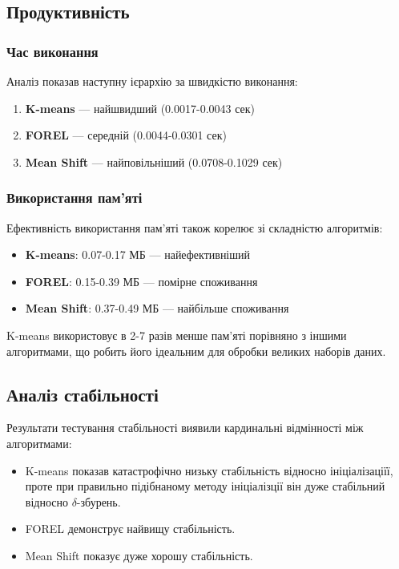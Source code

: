 \documentclass[12pt,a4paper]{article}
\begin{document}
\subsection{Продуктивність}

\subsubsection{Час виконання}
Аналіз показав наступну ієрархію за швидкістю виконання:

\begin{enumerate}
    \item \textbf{K-means} — найшвидший (0.0017-0.0043 сек)
    \item \textbf{FOREL} — середній (0.0044-0.0301 сек)
    \item \textbf{Mean Shift} — найповільніший (0.0708-0.1029 сек)
\end{enumerate}

\subsubsection{Використання пам'яті}
Ефективність використання пам'яті також корелює зі складністю алгоритмів:

\begin{itemize}
    \item \textbf{K-means}: 0.07-0.17 МБ — найефективніший
    \item \textbf{FOREL}: 0.15-0.39 МБ — помірне споживання
    \item \textbf{Mean Shift}: 0.37-0.49 МБ — найбільше споживання
\end{itemize}

K-means використовує в 2-7 разів менше пам'яті порівняно з іншими алгоритмами, що робить його ідеальним для обробки великих наборів даних.

\subsection{Аналіз стабільності}

Результати тестування стабільності виявили кардинальні відмінності між алгоритмами:

\begin{itemize}
    \item K-means показав катастрофічно низьку стабільність відносно ініціалізаціїї, проте при правильно підібнаному методу ініціалізції він дуже стабільний відносно $\delta$-збурень.
    \item FOREL демонструє найвищу стабільність.
    \item Mean Shift показує дуже хорошу стабільність.
\end{itemize}
\end{document}
